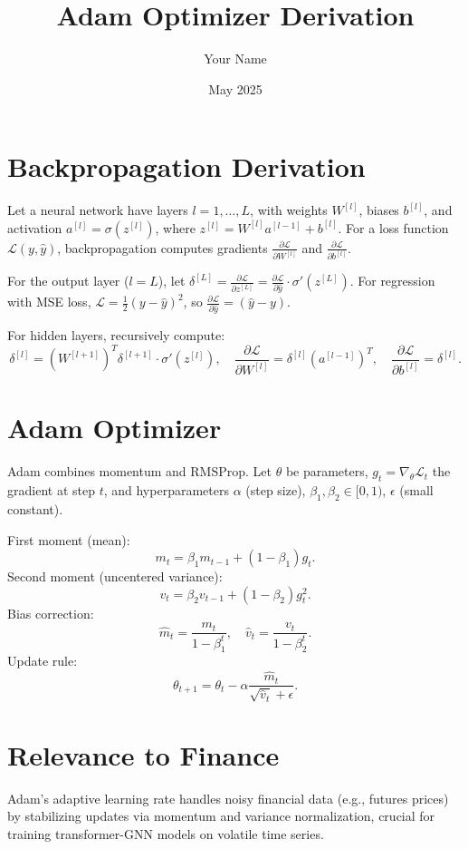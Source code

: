 \documentclass{article}
\begin{document}
\title{Adam Optimizer Derivation}
\author{Your Name}
\date{May 2025}
\maketitle

\section{Backpropagation Derivation}
Let a neural network have layers $l=1,\dots,L$, with weights $W^{[l]}$, biases $b^{[l]}$, and activation $a^{[l]} = \sigma(z^{[l]})$, where $z^{[l]} = W^{[l]}a^{[l-1]} + b^{[l]}$. For a loss function $\mathcal{L}(y, \hat{y})$, backpropagation computes gradients $\frac{\partial \mathcal{L}}{\partial W^{[l]}}$ and $\frac{\partial \mathcal{L}}{\partial b^{[l]}}$.

For the output layer ($l=L$), let $\delta^{[L]} = \frac{\partial \mathcal{L}}{\partial z^{[L]}} = \frac{\partial \mathcal{L}}{\partial \hat{y}} \cdot \sigma'(z^{[L]})$. For regression with MSE loss, $\mathcal{L} = \frac{1}{2}(y - \hat{y})^2$, so $\frac{\partial \mathcal{L}}{\partial \hat{y}} = (\hat{y} - y)$.

For hidden layers, recursively compute:
\[
\delta^{[l]} = (W^{[l+1]})^T \delta^{[l+1]} \cdot \sigma'(z^{[l]}), \quad \frac{\partial \mathcal{L}}{\partial W^{[l]}} = \delta^{[l]} (a^{[l-1]})^T, \quad \frac{\partial \mathcal{L}}{\partial b^{[l]}} = \delta^{[l]}.
\]

\section{Adam Optimizer}
Adam combines momentum and RMSProp. Let $\theta$ be parameters, $g_t = \nabla_\theta \mathcal{L}_t$ the gradient at step $t$, and hyperparameters $\alpha$ (step size), $\beta_1, \beta_2 \in [0,1)$, $\epsilon$ (small constant).

First moment (mean):
\[
m_t = \beta_1 m_{t-1} + (1 - \beta_1) g_t.
\]
Second moment (uncentered variance):
\[
v_t = \beta_2 v_{t-1} + (1 - \beta_2) g_t^2.
\]
Bias correction:
\[
\hat{m}_t = \frac{m_t}{1 - \beta_1^t}, \quad \hat{v}_t = \frac{v_t}{1 - \beta_2^t}.
\]
Update rule:
\[
\theta_{t+1} = \theta_t - \alpha \frac{\hat{m}_t}{\sqrt{\hat{v}_t} + \epsilon}.
\]

\section{Relevance to Finance}
Adam’s adaptive learning rate handles noisy financial data (e.g., futures prices) by stabilizing updates via momentum and variance normalization, crucial for training transformer-GNN models on volatile time series.
\end{document}
